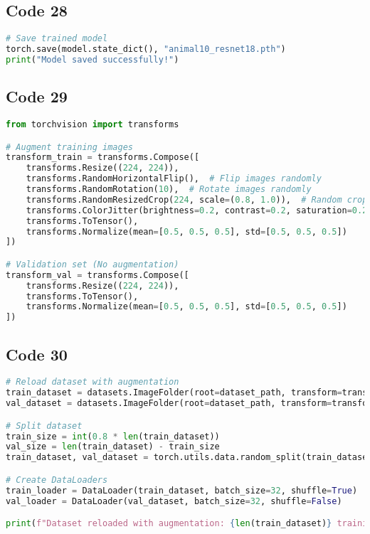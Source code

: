 \documentclass{article}
\begin{document}
\subsection*{Code 28}
\begin{lstlisting}[language=Python]
# Save trained model
torch.save(model.state_dict(), "animal10_resnet18.pth")
print("Model saved successfully!")
\end{lstlisting}

\subsection*{Code 29}
\begin{lstlisting}[language=Python]
from torchvision import transforms

# Augment training images
transform_train = transforms.Compose([
    transforms.Resize((224, 224)),
    transforms.RandomHorizontalFlip(),  # Flip images randomly
    transforms.RandomRotation(10),  # Rotate images randomly
    transforms.RandomResizedCrop(224, scale=(0.8, 1.0)),  # Random crop
    transforms.ColorJitter(brightness=0.2, contrast=0.2, saturation=0.2, hue=0.1),  # Color variation
    transforms.ToTensor(),
    transforms.Normalize(mean=[0.5, 0.5, 0.5], std=[0.5, 0.5, 0.5])
])

# Validation set (No augmentation)
transform_val = transforms.Compose([
    transforms.Resize((224, 224)),
    transforms.ToTensor(),
    transforms.Normalize(mean=[0.5, 0.5, 0.5], std=[0.5, 0.5, 0.5])
])
\end{lstlisting}

\subsection*{Code 30}
\begin{lstlisting}[language=Python]
# Reload dataset with augmentation
train_dataset = datasets.ImageFolder(root=dataset_path, transform=transform_train)
val_dataset = datasets.ImageFolder(root=dataset_path, transform=transform_val)

# Split dataset
train_size = int(0.8 * len(train_dataset))
val_size = len(train_dataset) - train_size
train_dataset, val_dataset = torch.utils.data.random_split(train_dataset, [train_size, val_size])

# Create DataLoaders
train_loader = DataLoader(train_dataset, batch_size=32, shuffle=True)
val_loader = DataLoader(val_dataset, batch_size=32, shuffle=False)

print(f"Dataset reloaded with augmentation: {len(train_dataset)} training images | {len(val_dataset)} validation images")

\end{lstlisting}
\end{document}
